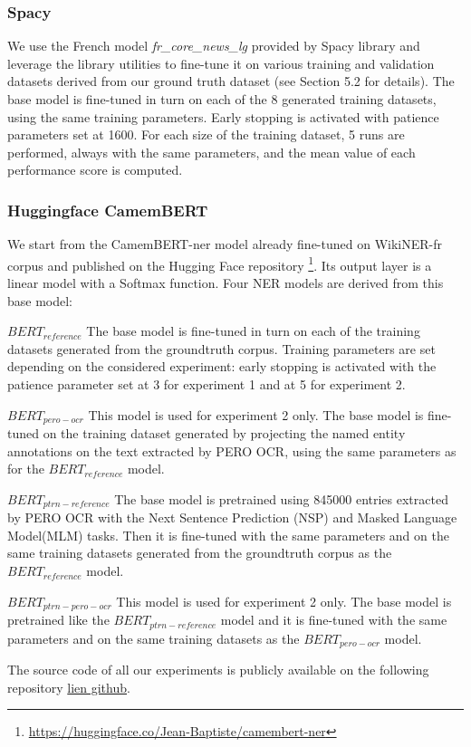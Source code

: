 \subsubsection{Spacy}
We use the French model \textit{fr\_core\_news\_lg} provided by Spacy library and leverage the library utilities to fine-tune it on various training and validation datasets derived from our ground truth dataset (see Section 5.2 for details). The base model is fine-tuned in turn on each of the 8 generated training datasets, using the same training parameters. Early stopping is activated with patience parameters set at 1600. For each size of the training dataset, 5 runs are performed, always with the same parameters, and the mean value of each performance score is computed.


\subsubsection{Huggingface CamemBERT}
We start from the CamemBERT-ner model already fine-tuned on WikiNER-fr corpus and published on the Hugging Face repository \footnote{\url{https://huggingface.co/Jean-Baptiste/camembert-ner}}. Its output layer is a linear model with a Softmax function. Four NER models are derived from this base model: 

$BERT_{reference}$ The base model is fine-tuned in turn on each of the training datasets generated from the groundtruth corpus. Training parameters are set depending on the considered experiment: early stopping is activated with the patience parameter set at 3 for experiment 1 and at 5 for experiment 2.

$BERT_{pero-ocr}$ This model is used for experiment 2 only. The base model is fine-tuned on the training dataset generated by projecting the named entity annotations on the text extracted by PERO OCR, using the same parameters as for the $BERT_{reference}$ model.

$BERT_{ptrn-reference}$ The base model is pretrained using 845000 entries extracted by PERO OCR with the Next  Sentence  Prediction  (NSP) and  Masked  Language  Model(MLM) tasks. Then it is fine-tuned with the same parameters and on the same training datasets generated from the groundtruth corpus as the $BERT_{reference}$ model.

$BERT_{ptrn-pero-ocr}$ This model is used for experiment 2 only. The base model is pretrained like the $BERT_{ptrn-reference}$ model and it is fine-tuned with the same parameters and on the same training datasets as the $BERT_{pero-ocr}$ model.

The source code of all our experiments is publicly available on the following repository \url{lien github}.